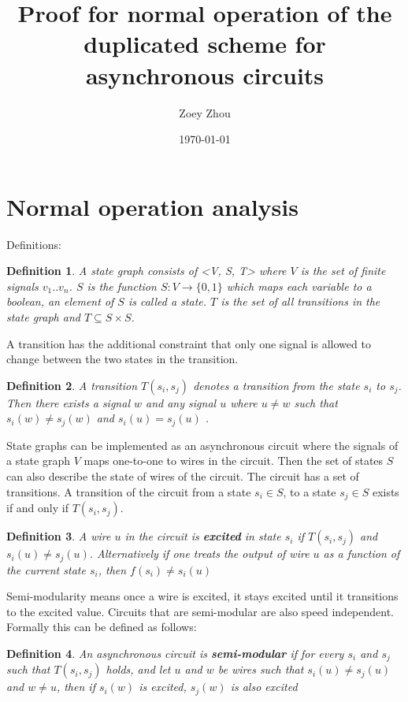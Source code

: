 \documentclass{article}
\title{Proof for normal operation of the duplicated scheme for asynchronous circuits}
\author{Zoey Zhou}
\date{\today}
\newtheorem*{definition}{Definition}
\begin{document}
\section{Normal operation analysis}
Definitions:  
\begin{definition}A state graph consists of <V, S, T> where $V$ is the set of finite signals $v_1 .. v_n$.  $S$ is the function $S: V \to \{0,1\}$ %
which maps each variable to a boolean, an element of $S$ is called a state. $T$ is the set of all transitions in the state graph and $T \subseteq S \times S$.  \end{definition}

A transition has the additional constraint that only one signal is allowed to change between the two states in the transition.
\begin{definition}A transition $T(s_i, s_j)$ denotes a transition from the state $s_i$ to $s_j$.  Then there exists a signal $w$ and any signal $u$ where $u \neq w$ such that $s_i(w)\neq s_j(w)$ and $s_i(u)=s_j(u)$ . 
\end{definition}

State graphs can be implemented as an asynchronous circuit where the signals of a state graph $V$ maps one-to-one to wires in the circuit. %
Then the set of states $S$ can also describe the state of wires of the circuit.  The circuit has a set of transitions.  A transition of the circuit from a state $s_i \in S$, to a state $s_j \in S$ exists if and only if $T(s_i, s_j)$.%
\begin{definition}A wire $u$ in the circuit is \textbf{excited} in state $s_i$ if $T(s_i,s_j)$ and $s_i(u) \neq s_j(u)$.  Alternatively if one treats the output of wire $u$ as a function of the current state $s_i$, then $f(s_i)\neq s_i(u)$\end{definition}

Semi-modularity means once a wire is excited, it stays excited until it transitions to the excited value.  Circuits that are semi-modular are also speed independent.  Formally this can be defined as follows:
\begin{definition}An asynchronous circuit is \textbf{semi-modular} if for every $s_i$ and $s_j$ such that $T(s_i,s_j)$ holds, and let $u$ and $w$ be wires such that $s_i(u) \neq s_j(u)$ and $w\neq u$, then if $s_i(w)$ is excited, $s_j(w)$ is also excited \end{definition}
\end{document}
